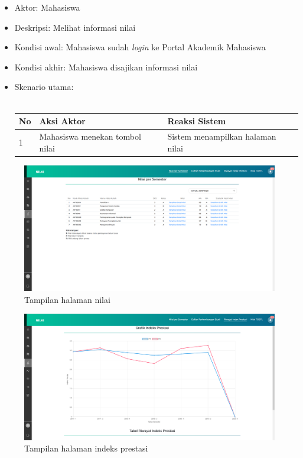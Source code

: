 \begin{enumerate}
\begin{itemize}
			\item Aktor: Mahasiswa
			\item Deskripsi: Melihat informasi nilai 
			\item Kondisi awal: Mahasiswa sudah \textit{login} ke Portal Akademik Mahasiswa
			\item Kondisi akhir: Mahasiswa disajikan informasi nilai
			\item Skenario utama: \\ \\
        \begin{tabular}{|p{0.5cm} |p{6cm}| p{6cm}|}
        \hline
            No & Aksi Aktor &  Reaksi Sistem \\ \hline     
            1 & Mahasiswa menekan tombol nilai & Sistem menampilkan halaman nilai \\ \hline 
        \end{tabular}
    \end{itemize}
     \begin{figure}[H]
				\centering
				\includegraphics[scale=0.3]{DokumenSkripsi/Gambar/nilai}
				\caption{Tampilan halaman nilai} 
				\label{fig:pam_nilai}
			\end{figure}
			\begin{figure}[H]
				\centering
				\includegraphics[scale=0.3]{DokumenSkripsi/Gambar/ipk}
				\caption{Tampilan halaman indeks prestasi} 
				\label{fig:pam_ipk}
			\end{figure}
\end{enumerate}

